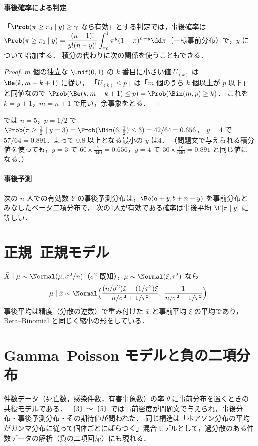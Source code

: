 \paragraph{事後確率による判定}
「$\Prob(\pi\ge\pi_0\mid y)\ge\gamma$ なら有効」とする判定では，事後確率は
$\Prob(\pi\ge\pi_0\mid y)=\dfrac{(n+1)!}{y!(n-y)!}\displaystyle\int_{\pi_0}^1\pi^y(1-\pi)^{n-y}\dd\pi$（一様事前分布）で，$y$ について増加する．
積分の代わりに次の関係を使うこともできる．
\begin{proof}
$m$ 個の独立な $\Unif(0,1)$ の $k$ 番目に小さい値 $U_{(k)}$ は $\Be(k,m-k+1)$ に従い，
「$U_{(k)}\le p$」は「$m$ 個のうち $k$ 個以上が $p$ 以下」と同値なので $\Prob(\Be(k,m-k+1)\le p)=\Prob(\Bin(m,p)\ge k)$．
これを $k=y+1$，$m=n+1$ で用い，余事象をとる．
\end{proof}
 では $n=5$，$p=1/2$ で $\Prob(\pi\ge\frac12\mid y=3)=\Prob(\Bin(6,\tfrac12)\le3)=42/64=0.656$，
$y=4$ で $57/64=0.891$．よって $0.8$ 以上となる最小の $y$ は4．
（問題文で与えられる積分値を使っても，$y=3$ で $60\times\frac{7}{640}=0.656$，$y=4$ で $30\times\frac{19}{640}=0.891$ と同じ値になる．）

\paragraph{事後予測}
次の $\tilde n$ 人での有効数 $\tilde Y$ の事後予測分布は，$\Be(a+y,b+n-y)$ を事前分布とみなしたベータ二項分布で，
次の1人が有効である確率は事後平均 $\E[\pi\mid y]$ に等しい．

\section{正規--正規モデル}\label{sec:17-normal}
$\bar X\mid\mu\sim\Normal(\mu,\sigma^2/n)$（$\sigma^2$ 既知），$\mu\sim\Normal(\xi,\tau^2)$ なら
\[
\mu\mid\bar x\sim\Normal\Bigl(\frac{(n/\sigma^2)\bar x+(1/\tau^2)\xi}{n/\sigma^2+1/\tau^2},\ \frac{1}{n/\sigma^2+1/\tau^2}\Bigr).
\]
事後平均は精度（分散の逆数）で重み付けた $\bar x$ と事前平均 $\xi$ の平均であり，Beta--Binomial と同じく縮小の形をしている．

\section{Gamma--Poisson モデルと負の二項分布}\label{sec:17-gammapois}
\Hinshutsu
件数データ（死亡数，感染件数，有害事象数）の率 $\theta$ に事前分布を置くときの共役モデルである．
〔3〕〜〔5〕では事前密度が問題文で与えられ，事後分布・事後予測分布・その期待値が問われた．
同じ構造は「ポアソン分布の平均がガンマ分布に従って個体ごとにばらつく」混合モデルとして，過分散のある件数データの解析（負の二項回帰）にも現れる．


